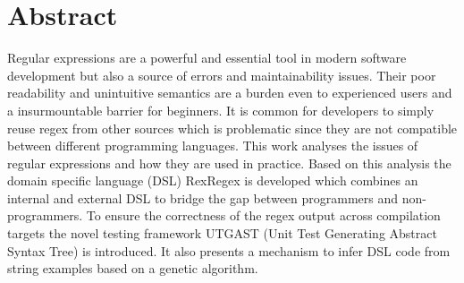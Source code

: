 \section*{Abstract}

Regular expressions are a powerful and essential tool in modern software development but also a source of errors and maintainability issues. Their poor readability and unintuitive semantics are a burden even to experienced users and a insurmountable barrier for beginners. It is common for developers to simply reuse regex from other sources which is problematic since they are not compatible between different programming languages. This work analyses the issues of regular expressions and how they are used in practice. Based on this analysis the domain specific language (DSL) RexRegex is developed which combines an internal and external DSL to bridge the gap between programmers and non-programmers. To ensure the correctness of the regex output across compilation targets the novel testing framework UTGAST (Unit Test Generating Abstract Syntax Tree) is introduced. It also presents a mechanism to infer DSL code from string examples based on a genetic algorithm.
